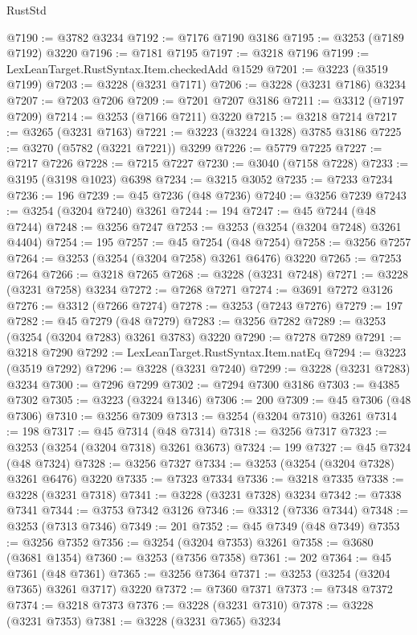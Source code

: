 \begin{lexlean}{RustStd}
\begin{coremodule}
@7190 := @3782 @3234
@7192 := @7176 @7190 @3186
@7195 := @3253 (@7189 @7192) @3220
@7196 := @7181 @7195
@7197 := @3218 @7196
@7199 := LexLeanTarget.RustSyntax.Item.checkedAdd @1529
@7201 := @3223 (@3519 @7199)
@7203 := @3228 (@3231 @7171)
@7206 := @3228 (@3231 @7186) @3234
@7207 := @7203 @7206
@7209 := @7201 @7207 @3186
@7211 := @3312 (@7197 @7209)
@7214 := @3253 (@7166 @7211) @3220
@7215 := @3218 @7214
@7217 := @3265 (@3231 @7163)
@7221 := @3223 (@3224 @1328) @3785 @3186
@7225 := @3270 (@5782 (@3221 @7221)) @3299
@7226 := @5779 @7225
@7227 := @7217 @7226
@7228 := @7215 @7227
@7230 := @3040 (@7158 @7228)
@7233 := @3195 (@3198 @1023) @6398
@7234 := @3215 @3052
@7235 := @7233 @7234
@7236 := 196
@7239 := @45 @7236 (@48 @7236)
@7240 := @3256 @7239
@7243 := @3254 (@3204 @7240) @3261
@7244 := 194
@7247 := @45 @7244 (@48 @7244)
@7248 := @3256 @7247
@7253 := @3253 (@3254 (@3204 @7248) @3261 @4404)
@7254 := 195
@7257 := @45 @7254 (@48 @7254)
@7258 := @3256 @7257
@7264 := @3253 (@3254 (@3204 @7258) @3261 @6476) @3220
@7265 := @7253 @7264
@7266 := @3218 @7265
@7268 := @3228 (@3231 @7248)
@7271 := @3228 (@3231 @7258) @3234
@7272 := @7268 @7271
@7274 := @3691 @7272 @3126
@7276 := @3312 (@7266 @7274)
@7278 := @3253 (@7243 @7276)
@7279 := 197
@7282 := @45 @7279 (@48 @7279)
@7283 := @3256 @7282
@7289 := @3253 (@3254 (@3204 @7283) @3261 @3783) @3220
@7290 := @7278 @7289
@7291 := @3218 @7290
@7292 := LexLeanTarget.RustSyntax.Item.natEq
@7294 := @3223 (@3519 @7292)
@7296 := @3228 (@3231 @7240)
@7299 := @3228 (@3231 @7283) @3234
@7300 := @7296 @7299
@7302 := @7294 @7300 @3186
@7303 := @4385 @7302
@7305 := @3223 (@3224 @1346)
@7306 := 200
@7309 := @45 @7306 (@48 @7306)
@7310 := @3256 @7309
@7313 := @3254 (@3204 @7310) @3261
@7314 := 198
@7317 := @45 @7314 (@48 @7314)
@7318 := @3256 @7317
@7323 := @3253 (@3254 (@3204 @7318) @3261 @3673)
@7324 := 199
@7327 := @45 @7324 (@48 @7324)
@7328 := @3256 @7327
@7334 := @3253 (@3254 (@3204 @7328) @3261 @6476) @3220
@7335 := @7323 @7334
@7336 := @3218 @7335
@7338 := @3228 (@3231 @7318)
@7341 := @3228 (@3231 @7328) @3234
@7342 := @7338 @7341
@7344 := @3753 @7342 @3126
@7346 := @3312 (@7336 @7344)
@7348 := @3253 (@7313 @7346)
@7349 := 201
@7352 := @45 @7349 (@48 @7349)
@7353 := @3256 @7352
@7356 := @3254 (@3204 @7353) @3261
@7358 := @3680 (@3681 @1354)
@7360 := @3253 (@7356 @7358)
@7361 := 202
@7364 := @45 @7361 (@48 @7361)
@7365 := @3256 @7364
@7371 := @3253 (@3254 (@3204 @7365) @3261 @3717) @3220
@7372 := @7360 @7371
@7373 := @7348 @7372
@7374 := @3218 @7373
@7376 := @3228 (@3231 @7310)
@7378 := @3228 (@3231 @7353)
@7381 := @3228 (@3231 @7365) @3234

\end{coremodule}
\end{lexlean}
